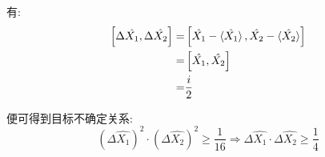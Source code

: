 \documentclass[twoside]{article}
\begin{document}
有:
\begin{equation*}
    \begin{split}
        \left[\Delta \hat{X_1}, \Delta \hat{X_2}\right] = & \left[\hat{X_1} - \braket{\hat{X_1}}, \hat{X_2} - \braket{\hat{X_2}}\right] \\
        =                                                 & \left[\hat{X_1}, \hat{X_2}\right]                                           \\
        =                                                 & \frac{i}{2}
    \end{split}
\end{equation*}

便可得到目标不确定关系:
\begin{equation*}
    \left(\Delta \hat{X_1}\right)^2 \cdot \left(\Delta \hat{X_2}\right)^2  \geqslant \frac{1}{16}  \Rightarrow \Delta \hat{X_1} \cdot \Delta \hat{X_2} \geqslant \frac{1}{4}
\end{equation*}
\end{document}
